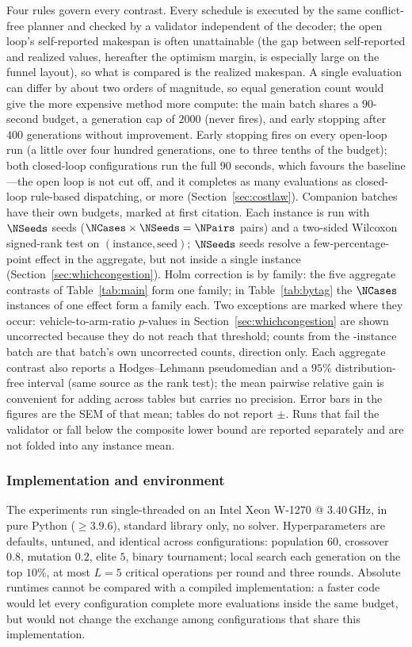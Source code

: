 Four rules govern every contrast.
Every schedule is executed by the same conflict-free planner and checked by a validator independent of the decoder; the open loop's self-reported makespan is often unattainable (the gap between self-reported and realized values, hereafter the optimism margin, is especially large on the funnel layout), so what is compared is the realized makespan.
A single evaluation can differ by about two orders of magnitude, so equal generation count would give the more expensive method more compute: the main batch shares a $90$-second budget, a generation cap of $2000$ (never fires), and early stopping after $400$ generations without improvement.
Early stopping fires on every open-loop run (a little over four hundred generations, one to three tenths of the budget); both closed-loop configurations run the full $90$ seconds, which favours the baseline---the open loop is not cut off, and it completes as many evaluations as closed-loop rule-based dispatching, or more (Section~\ref{sec:costlaw}).
Companion batches have their own budgets, marked at first citation.
Each instance is run with $\NSeeds$ seeds ($\NCases\times\NSeeds=\NPairs$ pairs) and a two-sided Wilcoxon signed-rank test on $(\text{instance},\text{seed})$; $\NSeeds$ seeds resolve a few-percentage-point effect in the aggregate, but not inside a single instance (Section~\ref{sec:whichcongestion}).
Holm correction is by family: the five aggregate contrasts of Table~\ref{tab:main} form one family; in Table~\ref{tab:bytag} the $\NCases$ instances of one effect form a family each.
Two exceptions are marked where they occur: vehicle-to-arm-ratio $p$-values in Section~\ref{sec:whichcongestion} are shown uncorrected because they do not reach that threshold; counts from the \MatrixCells{}-instance batch are that batch's own uncorrected counts, direction only.
Each aggregate contrast also reports a Hodges--Lehmann pseudomedian and a $95\%$ distribution-free interval (same source as the rank test); the mean pairwise relative gain is convenient for adding across tables but carries no precision.
Error bars in the figures are the SEM of that mean; tables do not report $\pm$.
Runs that fail the validator or fall below the composite lower bound are reported separately and are not folded into any instance mean.

\subsubsection{Implementation and environment}
\label{sec:impl}
The experiments run single-threaded on an Intel Xeon W-1270 @ $3.40$\,GHz, in pure Python ($\ge 3.9.6$), standard library only, no solver.
Hyperparameters are defaults, untuned, and identical across configurations: population $60$, crossover $0.8$, mutation $0.2$, elite $5$, binary tournament; local search each generation on the top $10\%$, at most $L=5$ critical operations per round and three rounds.
Absolute runtimes cannot be compared with a compiled implementation: a faster code would let every configuration complete more evaluations inside the same budget, but would not change the exchange among configurations that share this implementation.


